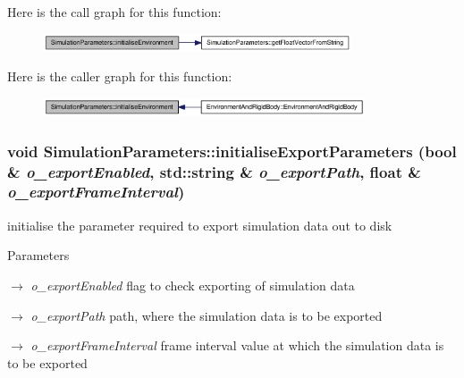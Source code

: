 Here is the call graph for this function:\nopagebreak
\begin{figure}[H]
\begin{center}
\leavevmode
\includegraphics[width=259pt]{class_simulation_parameters_abdf9f384bef40423ebb38515f206b08d_cgraph}
\end{center}
\end{figure}




Here is the caller graph for this function:\nopagebreak
\begin{figure}[H]
\begin{center}
\leavevmode
\includegraphics[width=270pt]{class_simulation_parameters_abdf9f384bef40423ebb38515f206b08d_icgraph}
\end{center}
\end{figure}


\hypertarget{class_simulation_parameters_a216667d44e3d5498187a54ea1aa05116}{
\subsubsection[{initialiseExportParameters}]{\setlength{\rightskip}{0pt plus 5cm}void SimulationParameters::initialiseExportParameters (bool \& {\em o\_\-exportEnabled}, \/  std::string \& {\em o\_\-exportPath}, \/  float \& {\em o\_\-exportFrameInterval})}}
\label{class_simulation_parameters_a216667d44e3d5498187a54ea1aa05116}


initialise the parameter required to export simulation data out to disk 


\begin{DoxyParams}{Parameters}
\item[\mbox{$\rightarrow$} {\em o\_\-exportEnabled}]flag to check exporting of simulation data \item[\mbox{$\rightarrow$} {\em o\_\-exportPath}]path, where the simulation data is to be exported \item[\mbox{$\rightarrow$} {\em o\_\-exportFrameInterval}]frame interval value at which the simulation data is to be exported \end{DoxyParams}


